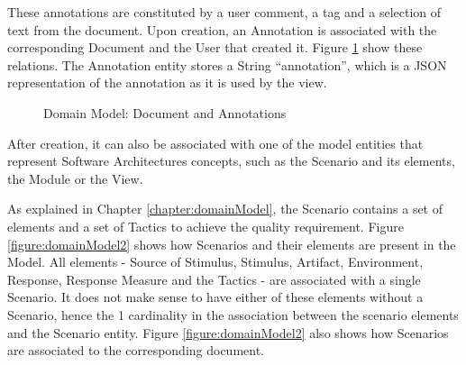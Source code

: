These annotations are constituted by a user comment, a tag and a selection of text from the document. Upon creation, an Annotation is associated with the corresponding Document and the User that created it. Figure \ref{figure:domainModel1} show these relations. The Annotation entity stores a String ``annotation'', which is a JSON representation of the annotation as it is used by the view.

\begin{figure}
\centering
\renewcommand {\umltextcolor}{black}
\renewcommand {\umlfillcolor}{none}
\renewcommand {\umldrawcolor}{black}

\caption{Domain Model: Document and Annotations}
\label{figure:domainModel1}
\end{figure} 

After creation, it can also be associated with one of the model entities that represent Software Architectures concepts, such as the Scenario and its elements, the Module or the View. 

As explained in Chapter \ref{chapter:domainModel}, the Scenario contains a set of elements and a set of Tactics to achieve the quality requirement. Figure \ref{figure:domainModel2} shows how Scenarios and their elements are present in the Model. All elements - Source of Stimulus, Stimulus, Artifact, Environment, Response, Response Measure and the Tactics - are associated with a single Scenario. It does not make sense to have either of these elements without a Scenario, hence the 1 cardinality in the association between the scenario elements and the Scenario entity. Figure \ref{figure:domainModel2} also shows how Scenarios are associated to the corresponding document.

